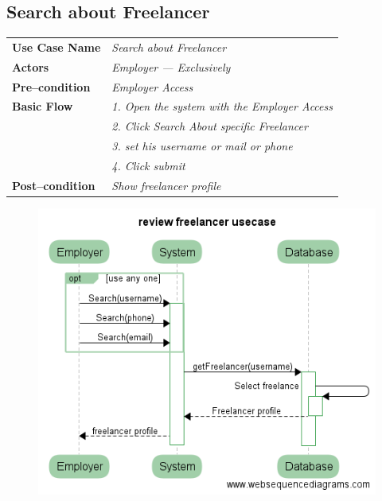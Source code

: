 \documentclass{article}
\begin{document}
\subsection{Search about Freelancer}
    \begin{tabular}{ l | l }
    \toprule
      \rowcolor{LightCyan}
      \textbf{Use Case Name}    & \textit{Search about Freelancer}\\
      \textbf{Actors}           & \textit{Employer --- Exclusively}\\
      \rowcolor{LightCyan}
      \textbf{Pre--condition}   & \textit{Employer Access}\\
      \textbf{Basic Flow}       & \textit{1. Open the system with the Employer Access}\\
                                & \textit{2. Click Search About specific Freelancer}\\
                                & \textit{3. set his username or mail or phone}\\
                                & \textit{4. Click submit}\\
      \rowcolor{LightCyan}
      \textbf{Post--condition}  & \textit{Show freelancer profile}\\
    \toprule
    \end{tabular}

\begin{figure}[ht!]
\centering
\includegraphics[width=128mm]{Search_freelancer_usecase.png}
\end{figure}
\end{document}
